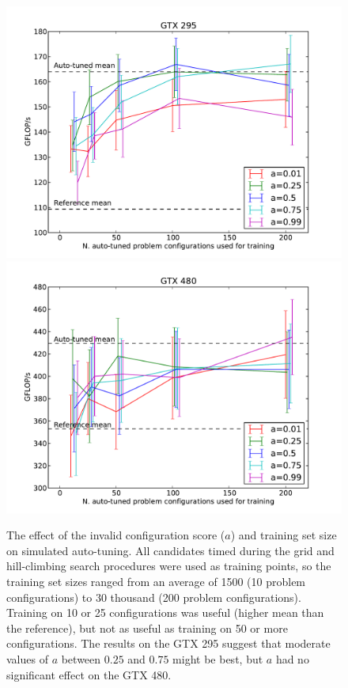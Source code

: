 \documentclass{sig-alternate}
\begin{document}
\begin{figure}
\centering
\includegraphics[scale=.42]{fig_ntrain_295.pdf} %
\includegraphics[scale=.42]{fig_ntrain_480.pdf} %
\caption{The effect of the invalid configuration score ($a$) and training set
size on simulated auto-tuning.
All candidates timed during the grid and
hill-climbing search procedures were used as training points, so the training
set sizes ranged from an average of 1500 (10 problem configurations) to 30
thousand (200 problem configurations).
Training on 10 or 25 configurations was useful (higher mean than the reference),
but not as useful as training on 50 or more configurations.
The results on the GTX 295 suggest that
moderate values of $a$ between $0.25$ and $0.75$ might be
best, but $a$ had no significant effect on the GTX 480.
}
\label{fig:fig_ntrain}
\end{figure}
\end{document}
